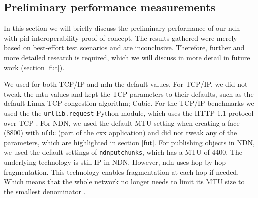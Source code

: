 

\subsection{Preliminary performance measurements}
\label{discussion-performance}
In this section we will briefly discuss the preliminary performance of our \gls{ndn} with \gls{pid} interoperability proof of concept. The results gathered were merely based on best-effort test scenarios and are inconclusive. Therefore, further and more detailed research is required, which we will discuss in more detail in future work (section \ref{fut}). 


We used for both TCP/IP and \gls{ndn} the default values.
For TCP/IP, we did not tweak the \gls{mtu} values and kept the TCP parameters to their defaults, such as the default Linux TCP congestion algorithm; Cubic. For the TCP/IP benchmarks we used the the \texttt{urllib.request} Python module, which uses the HTTP 1.1 protocol over TCP \cite{urllib}. For NDN, we used the default MTU setting when creating a face (8800) with \texttt{nfdc} (part of the \gls{cxx} application) and did not tweak any of the parameters, which are highlighted in section \ref{fut}. For publishing objects in NDN, we used the default settings of \texttt{ndnputchunks}, which has a MTU of 4400. The underlying technology is still IP in NDN. However, \gls{ndn} uses hop-by-hop fragmentation. This technology enables fragmentation at each hop if needed. Which means that the whole network no longer needs to limit its MTU size to the smallest denominator \cite{ndn-mtu}.

